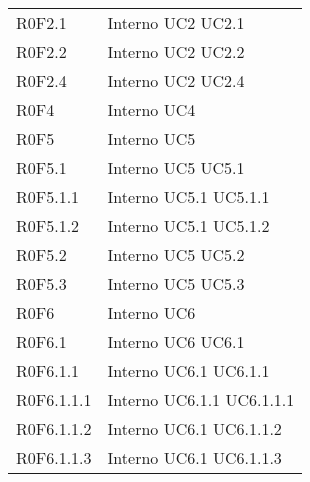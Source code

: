 \begin{longtable}{p{2.5cm}!{\VRule[1pt]}p{2.5cm}}
 \\
R0F2.1 & Interno \newline UC2
 \newline UC2.1
 \\
R0F2.2 & Interno \newline UC2
 \newline UC2.2
 \\
R0F2.4 & Interno \newline UC2
 \newline UC2.4
 \\
R0F4 & Interno \newline UC4
 \\
R0F5 & Interno \newline UC5
 \\
R0F5.1 & Interno \newline UC5
 \newline UC5.1
 \\
R0F5.1.1 & Interno \newline UC5.1
 \newline UC5.1.1
 \\
R0F5.1.2 & Interno \newline UC5.1
 \newline UC5.1.2
 \\
R0F5.2 & Interno \newline UC5
 \newline UC5.2
 \\
R0F5.3 & Interno \newline UC5
 \newline UC5.3
 \\
R0F6 & Interno \newline UC6
 \\
R0F6.1 & Interno \newline UC6
 \newline UC6.1
 \\
R0F6.1.1 & Interno \newline UC6.1
 \newline UC6.1.1
 \\
R0F6.1.1.1 & Interno \newline UC6.1.1
 \newline UC6.1.1.1
 \\
R0F6.1.1.2 & Interno \newline UC6.1
 \newline UC6.1.1.2
 \\
R0F6.1.1.3 & Interno \newline UC6.1
 \newline UC6.1.1.3
 \\

\end{longtable}
